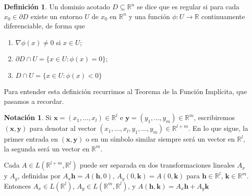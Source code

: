 \documentclass{report}
\newcommand{\realNumbers}{\mathbb{R}}
\theoremstyle{definition}
\newtheorem{definition}{Definición}
\newtheorem{notation}{Notación}
\theoremstyle{remark}
\begin{document}
  \begin{definition}
    Un dominio acotado \(D \subseteq \realNumbers^n\) se dice que es regular si para cada \(x_0 \in \partial D\) existe un entorno \(U\) de \(x_0\) en \(\realNumbers^n\) y una función \(\phi : U \rightarrow \realNumbers\) continuamente diferenciable, de forma que
    \begin{enumerate}
      \item \(\nabla \phi(x) \neq 0\) si \(x \in U\);
      \item \(\partial D \cap U = \{x \in U : \phi(x) = 0\}\);
      \item \(D \cap U = \{x \in U : \phi(x) < 0\}\)
    \end{enumerate}
  \end{definition}

  Para entender esta definición recurrimos al Teorema de la Función Implícita, que pasamos a recordar.

  \begin{notation}
    Si \(\mathbf{x} = (x_1, \dots, x_l) \in \realNumbers^l\) e \(\mathbf{y} = (y_1, \dots, y_m) \in \realNumbers^m\), escribiremos \((\mathbf{x}, \mathbf{y})\) para denotar al vector \((x_1, \dots, x_l, y_1, \dots, y_m) \in \realNumbers^{l + m}\).
    En lo que sigue, la primer entrada en \((\mathbf{x}, \mathbf{y})\) o en un símbolo similar siempre será un vector en \(\realNumbers^l\), la segunda será un vector en \(\realNumbers^m\).

    Cada \(A \in L(\realNumbers^{l + m}, \realNumbers^l)\) puede ser separada en dos transformaciones lineales \(A_x\) y \(A_y\), definidas por \(A_x \mathbf{h} = A(\mathbf{h}, 0)\), \(A_y(0, \mathbf{k}) = A(0, \mathbf{k})\) para \(\mathbf{h} \in \realNumbers^l\), \(\mathbf{k} \in \realNumbers^m\).
    Entonces \(A_x \in L(\realNumbers^l)\), \(A_y \in L(\realNumbers^m, \realNumbers^l)\), y \(A(\mathbf{h}, \mathbf{k}) = A_x \mathbf{h} + A_y \mathbf{k}\)
  \end{notation}
\end{document}

